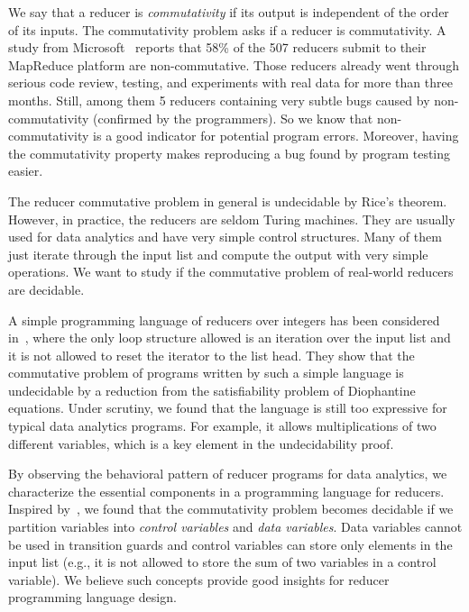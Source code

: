 \documentclass[runningheads,a4paper]{llncs}
\begin{document}
We say that a reducer is \emph{commutativity} if its output is independent of the order of its inputs. The commutativity problem asks if a reducer is commutativity. A study from Microsoft~\cite{XZZ+14} reports that 58\% of the 507 reducers submit to their MapReduce platform are non-commutative. 
Those reducers already went through serious code review, testing, and experiments with real data for more than three months. Still, among them 5 reducers containing very subtle bugs caused by non-commutativity (confirmed by the programmers). 
So we know that non-commutativity is a good indicator for potential program errors. 
Moreover, having the commutativity property makes reproducing a bug found by program testing easier.

The reducer commutative problem in general is undecidable by Rice's theorem. However, in practice, the reducers are seldom Turing machines. They are usually used for data analytics and have very simple control structures. Many of them just iterate through the input list and compute the output with very simple operations.
We want to study if the commutative problem of real-world reducers are decidable.

A simple programming language of reducers over integers has been considered in~\cite{CHSW15}, where the only loop structure allowed is an iteration over the input list and it is not allowed to reset the iterator to the list head. They show that the commutative problem of programs written by such a simple language is undecidable by a reduction from the satisfiability problem of Diophantine equations. Under scrutiny, we found that the language is still too expressive for typical data analytics programs. For example, it allows multiplications of two different variables, which is a key element in the undecidability proof. 

By observing the behavioral pattern of reducer programs for data analytics, we characterize the essential components in a programming language for reducers. %
Inspired by~\cite{RP11}, we found that the commutativity problem becomes decidable if we partition variables into \emph{control variables} and \emph{data variables}. Data variables cannot be used in transition guards and control variables can store only elements in the input list (e.g., it is not allowed to store the sum of two variables in a control variable). 
We believe such concepts provide good insights for reducer programming language design.
\end{document}
